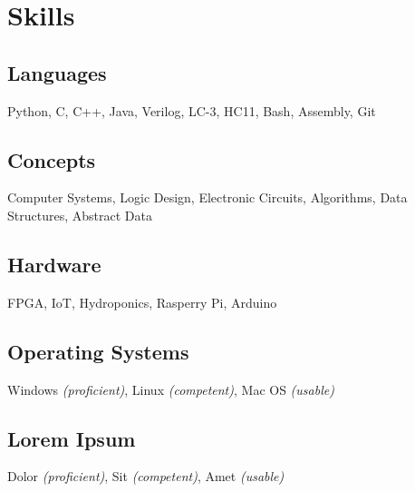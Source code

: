 \documentclass[12pt,letterpaper]{report}
\begin{document}
	\begin{minipage}[t]{0.2\linewidth}

    \section*{Skills}
    \raggedright
    \subsection*{Languages}
        Python, C, C++, Java, Verilog, LC-3, HC11, Bash, Assembly, Git 
	\vspace{1em}
	\subsection*{Concepts}
    Computer Systems, Logic Design, Electronic Circuits, Algorithms, \newline Data Structures, Abstract Data
      \vspace{1em}
    \subsection*{Hardware}
         FPGA, IoT, Hydroponics, Rasperry Pi, Arduino
	\vspace{1em}
    \subsection*{Operating Systems}
        Windows \textit{(proficient)}, Linux \textit{(competent)}, Mac OS \textit{(usable)}
    \vspace{1em}
     \subsection*{Lorem Ipsum}
    Dolor \textit{(proficient)}, Sit \textit{(competent)}, Amet \textit{(usable)}

	\end{minipage}
	
	
\end{document}
